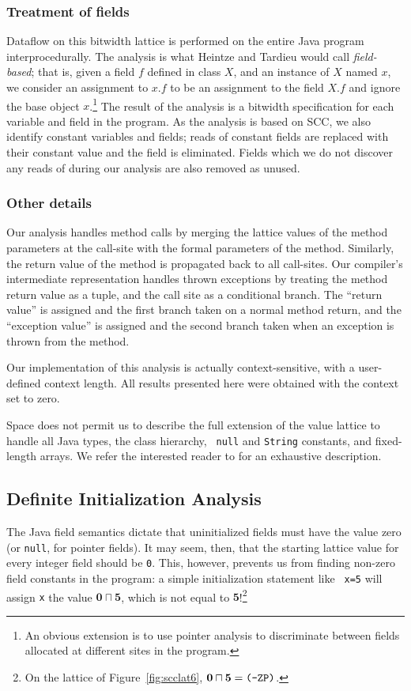 \documentclass{acmconf}
\newcommand{\meet}{\ensuremath{\sqcap}}
\begin{document}
\subsubsection{Treatment of fields}
Dataflow on this bitwidth lattice is performed on the entire Java
program interprocedurally.  The analysis is what Heintze and Tardieu
\cite{heintze01}
would call {\it field-based}; that is, given a field $f$ defined in
class $X$, and an instance of $X$ named $x$, we consider an assignment
to $x.f$ to be an assignment to the field $X.f$ and ignore the base
object $x$.\footnote{An obvious extension is to use pointer
analysis to discriminate between fields allocated at different sites
in the program.}  The result of the analysis is a bitwidth
specification for each variable and field in the program.  As the
analysis is based on SCC, we also identify constant variables and
fields; reads of constant fields are replaced with their constant
value and the field is eliminated.  Fields which we do not discover
any reads of during our analysis are also removed as unused.

\subsubsection{Other details}
Our analysis handles method calls by merging the lattice values of the
method parameters at the call-site with the formal parameters of the
method.  Similarly, the return value of the method is propagated back
to all call-sites.  Our compiler's intermediate representation handles
thrown exceptions by treating the method return value as a tuple, and
the call site as a conditional branch.  The ``return value'' is
assigned and the first branch taken on a normal method return, and the
``exception value'' is assigned and the second branch taken when an
exception is thrown from the method.

Our implementation of this analysis is actually context-sensitive,
with a user-defined context length.  All results presented here were
obtained with the context set to zero.

Space does not permit us to describe the full extension of the value
lattice to handle all Java types, the class hierarchy, {\tt
  null} and {\tt String} constants, and fixed-length arrays.
We refer the interested reader to \cite{ananian99:tech} for an
exhaustive description.

\subsection{Definite Initialization Analysis}
The Java field semantics dictate that uninitialized fields must have
the value zero (or {\tt null}, for pointer fields).  It may seem,
then, that the starting lattice value for every integer field should
be {\tt 0}.  This, however, prevents us from finding non-zero field
constants in the program: a simple initialization statement like {\tt
  x=5} will assign {\tt x} the value $\mathbf{0}\meet\mathbf{5}$,
which is not equal to $\mathbf{5}$!\footnote{On the lattice of
  Figure~\ref{fig:scclat6}, $\mathbf{0}\meet\mathbf{5}=\text{\tt
    (-ZP)}$.}
\end{document}
